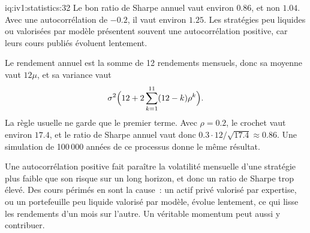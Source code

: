 \begin{solution}{iq:iv1:statistics:32}
Le bon ratio de Sharpe annuel vaut environ $0.86$, et non $1.04$. Avec une autocorrélation de $-0.2$, il vaut environ $1.25$. Les stratégies peu liquides ou valorisées par modèle présentent souvent une autocorrélation positive, car leurs cours publiés évoluent lentement.

Le rendement annuel est la somme de 12 rendements mensuels, donc sa moyenne vaut $12\mu$, et sa variance vaut
\[
\sigma^2\Bigl(12 + 2\sum_{k = 1}^{11}(12 - k)\rho^k\Bigr).
\]
La règle usuelle ne garde que le premier terme. Avec $\rho = 0.2$, le crochet vaut environ $17.4$, et le ratio de Sharpe annuel vaut donc $0.3 \cdot 12/\sqrt{17.4} \approx 0.86$. Une simulation de 100\,000 années de ce processus donne le même résultat.

Une autocorrélation positive fait paraître la volatilité mensuelle d'une stratégie plus faible que son risque sur un long horizon, et donc un ratio de Sharpe trop élevé. Des cours périmés en sont la cause~: un actif privé valorisé par expertise, ou un portefeuille peu liquide valorisé par modèle, évolue lentement, ce qui lisse les rendements d'un mois sur l'autre. Un véritable momentum peut aussi y contribuer.

\end{solution}

